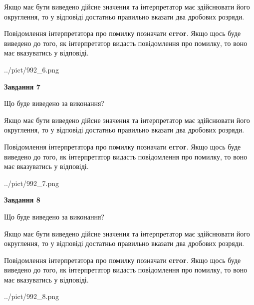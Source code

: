 \documentclass[12pt, ukrainian]{article}
\begin{document}
{\begin {Large}
Якщо має бути виведено дійсне значення та інтерпретатор має здійснювати його округлення, 
то у відповіді достатньо правильно вказати два дробових розряди.

Повідомлення інтерпретатора про помилку позначати \textbf{error}.
Якщо щось буде виведено до того, як інтерпретатор видасть повідомлення про помилку, 
то воно має вказуватись у відповіді. \par

\begin{center}
	{../pict/992_6.png}
\end{center}
\newpage

{\begin {center}\textbf{Завдання 7}\end {center}}\par
Що буде виведено за виконання? \par

Якщо має бути виведено дійсне значення та інтерпретатор має здійснювати його округлення, 
то у відповіді достатньо правильно вказати два дробових розряди.

Повідомлення інтерпретатора про помилку позначати \textbf{error}.
Якщо щось буде виведено до того, як інтерпретатор видасть повідомлення про помилку, 
то воно має вказуватись у відповіді. \par

\begin{center}
	{../pict/992_7.png}
\end{center}
\newpage

{\begin {center}\textbf{Завдання 8}\end {center}}\par
Що буде виведено за виконання? \par

Якщо має бути виведено дійсне значення та інтерпретатор має здійснювати його округлення, 
то у відповіді достатньо правильно вказати два дробових розряди.

Повідомлення інтерпретатора про помилку позначати \textbf{error}.
Якщо щось буде виведено до того, як інтерпретатор видасть повідомлення про помилку, 
то воно має вказуватись у відповіді. \par

\begin{center}
	{../pict/992_8.png}
\end{center}
\newpage


\end{Large}}
\end{document}
